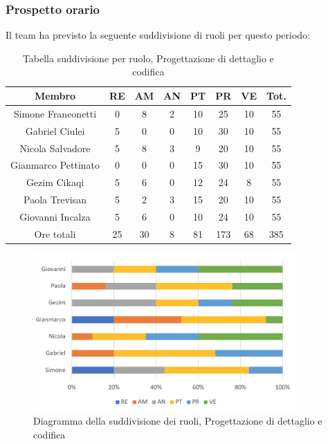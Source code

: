 \subsubsection{Prospetto orario}
Il team ha previsto la seguente suddivisione di ruoli per questo periodo:
\begin{table}[h]
\caption{Tabella suddivisione per ruolo, Progettazione di dettaglio e codifica}  
\begin{center}
\begin{tabular}{ |c|c|c|c|c|c|c|c|  }
 \hline
 Membro 		& RE 	& AM 	& AN 	& PT 	& PR 	& VE 	& Tot.\\
 \hline\hline
 Simone	Franconetti		& 0 		& 8		& 2 	& 10 	& 25 		& 10 		& 55\\
 Gabriel Ciulei		& 5 		& 0 		& 0 	& 10		& 30 		& 10 		& 55\\
 Nicola	Salvadore		& 5 		& 8 		& 3 	& 9 		& 20 		& 10 		& 55\\
 Gianmarco	Pettinato	& 0 		& 0 		& 0 	& 15 	& 30 		& 10 		& 55\\
 Gezim	Cikaqi		& 5 		& 6 		& 0 	& 12 	& 24 		& 8	 		& 55\\
 Paola	Trevisan		& 5 		& 2 		& 3 	& 15 	& 20 		& 10 		& 55\\
 Giovanni	Incalza	& 5 		& 6	 	& 0 	& 10 	& 24 		& 10  		& 55\\
 \hline\hline
 Ore totali		& 25		& 30		& 8 	& 81	 	& 173 	& 68 	& 385\\
  \hline
\end{tabular}
\end{center}
\end{table}
\begin{figure}[h!]
	\centering
	\includegraphics[width=0.9\textwidth]{res/img/hi33}
	\caption{Diagramma della suddivisione dei ruoli, Progettazione di dettaglio e codifica}
\end{figure}

